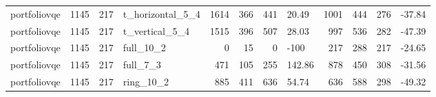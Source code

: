 \begin{longtable}{lrrlrrrlrrrl}
portfoliovqe & 1145 & 217 & t\_horizontal\_5\_4 & 1614 & 366 & 441 & 20.49 & 1001 & 444 & 276 & -37.84 \\
portfoliovqe & 1145 & 217 & t\_vertical\_5\_4 & 1515 & 396 & 507 & 28.03 & 997 & 536 & 282 & -47.39 \\
portfoliovqe & 1145 & 217 & full\_10\_2 & 0 & 15 & 0 & -100 & 217 & 288 & 217 & -24.65 \\
portfoliovqe & 1145 & 217 & full\_7\_3 & 471 & 105 & 255 & 142.86 & 878 & 450 & 308 & -31.56 \\
portfoliovqe & 1145 & 217 & ring\_10\_2 & 885 & 411 & 636 & 54.74 & 636 & 588 & 298 & -49.32 \\
\end{longtable}
